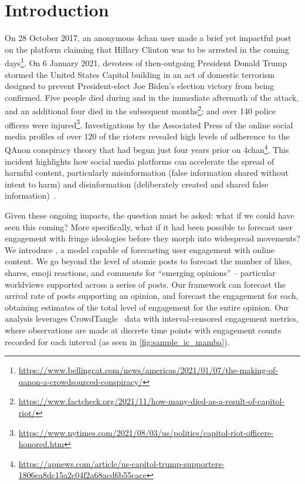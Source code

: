 \section{Introduction}


On 28 October 2017, an anonymous 4chan user made a brief yet impactful post on the platform claiming that Hillary Clinton was to be arrested in the coming days\footnote{\url{https://www.bellingcat.com/news/americas/2021/01/07/the-making-of-qanon-a-crowdsourced-conspiracy/}}.
On 6 January 2021, devotees of then-outgoing President Donald Trump stormed the United States Capitol building in an act of domestic terrorism designed to prevent President-elect Joe Biden's election victory from being confirmed. Five people died during and in the immediate aftermath of the attack, and an additional four died in the subsequent months\footnote{\url{https://www.factcheck.org/2021/11/how-many-died-as-a-result-of-capitol-riot/}}; and over 140 police officers were injured\footnote{\url{https://www.nytimes.com/2021/08/03/us/politics/capitol-riot-officers-honored.htm}}. 
Investigations by the Associated Press of the online social media profiles of over 120 of the rioters revealed high levels of adherence to the QAnon conspiracy theory that had begun just four years prior on 4chan\footnote{\url{https://apnews.com/article/us-capitol-trump-supporters-1806ea8dc15a2c04f2a68acd6b55cace}}.
This incident highlights how social media platforms can accelerate the spread of harmful content, particularly misinformation (false information shared without intent to harm) and disinformation (deliberately created and shared false information)~\citep{lazer2018science,scheufele2019science}.

Given these ongoing impacts, the question must be asked: what if we could have seen this coming? More specifically, what if it had been possible to forecast user engagement with fringe ideologies before they morph into widespread movements? 
We introduce \icmamba, a model capable of forecasting user engagement with online content. We go beyond the level of atomic posts to forecast the number of likes, shares, emoji reactions, and comments for ``emerging opinions'' -- particular worldviews supported across a series of posts.
Our framework can forecast the arrival rate of posts supporting an opinion, and forecast the engagement for each, obtaining estimates of the total level of engagement for the entire opinion.
Our analysis leverages CrowdTangle~\cite{crowdtangle} data with interval-censored engagement metrics, where observations are made at discrete time points with engagement counts recorded for each interval (as seen in \cref{fig:sample_ic_mamba}).

